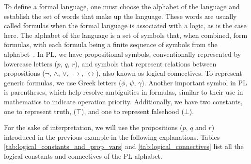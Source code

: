 To define a formal language, one must choose the alphabet of the language and establish the set of words that make up the language. These words are usually called formulas when the formal language is associated with a logic, as is the case here. The alphabet of the language is a set of symbols that, when combined, form formulas, with each formula being a finite sequence of symbols from the alphabet~\cite{gouveia_lgica}. In \gls{PL}, we have propositional symbols, conventionally represented by lowercase letters (\(p\), \(q\), \(r\)), and symbols that represent relations between propositions (\(\neg\), \(\land\), \(\lor\), \(\to\), \(\leftrightarrow\)), also known as logical connectives. To represent generic formulas, we use Greek letters (\(\phi\), \(\psi\), \(\gamma\)). Another important symbol in \gls{PL} is parentheses, which help resolve ambiguities in formulas, similar to their use in mathematics to indicate operation priority. Additionally, we have two constants, one to represent truth, (\(\top\)), and one to represent falsehood (\(\bot\)).

For the sake of interpretation, we will use the propositions (\(p\), \(q\) and \(r\)) introduced in the previous example in the following explanations. Tables \ref{tab:logical_constants_and_prop_vars} and \ref{tab:logical_connectives} list all the logical constants and connectives of the \gls{PL} alphabet.

\begin{table}[h!]
    \centering
    \caption{Logical constants in Propositional Logic}
    \label{tab:logical_constants_and_prop_vars}
\end{table}

\begin{table}[h!]
    \centering
    \caption{Logical connectives in Propositional Logic}
    \label{tab:logical_connectives}
\end{table}

